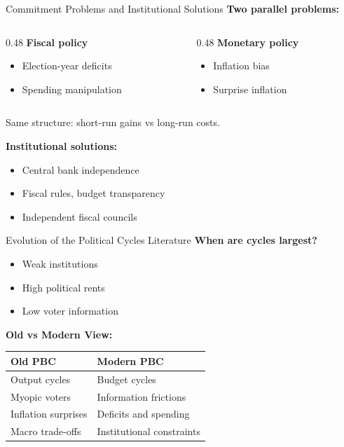 \documentclass[10pt]{beamer}
\begin{document}
\begin{frame}{Commitment Problems and Institutional Solutions}
\textbf{Two parallel problems:}

\begin{columns}
\begin{column}{0.48\textwidth}
\textbf{Fiscal policy}
\begin{itemize}
\item Election-year deficits
\item Spending manipulation
\end{itemize}
\end{column}

\begin{column}{0.48\textwidth}
\textbf{Monetary policy}
\begin{itemize}
\item Inflation bias
\item Surprise inflation
\end{itemize}
\end{column}
\end{columns}

\vspace{0.3cm}
\alert{Same structure: short-run gains vs long-run costs.}

\vspace{0.3cm}
\textbf{Institutional solutions:}
\begin{itemize}
\item Central bank independence
\item Fiscal rules, budget transparency
\item Independent fiscal councils
\end{itemize}
\end{frame}

\begin{frame}{Evolution of the Political Cycles Literature}
\textbf{When are cycles largest?}
\begin{itemize}
\item Weak institutions
\item High political rents
\item Low voter information
\end{itemize}

\vspace{0.3cm}
\textbf{Old vs Modern View:}

\begin{tabular}{p{} p{}}
\toprule
\textbf{Old PBC} & \textbf{Modern PBC} \\
\midrule
Output cycles & Budget cycles \\
Myopic voters & Information frictions \\
Inflation surprises & Deficits and spending \\
Macro trade-offs & Institutional constraints \\
\bottomrule
\end{tabular}
\end{frame}
\end{document}
